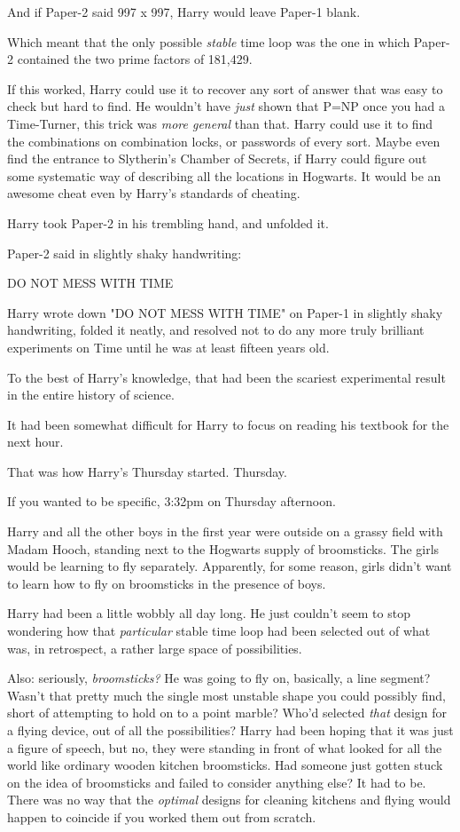 And if Paper-2 said 997 x 997, Harry would leave Paper-1 blank.

Which meant that the only possible \emph{stable} time loop was the one in which 
Paper-2 contained the two prime factors of 181,429.

If this worked, Harry could use it to recover any sort of answer that was easy 
to check but hard to find. He wouldn't have \emph{just} shown that P=NP once 
you had a Time-Turner, this trick was \emph{more general} than that. Harry 
could use it to find the combinations on combination locks, or passwords of 
every sort. Maybe even find the entrance to Slytherin's Chamber of Secrets, if 
Harry could figure out some systematic way of describing all the locations in 
Hogwarts. It would be an awesome cheat even by Harry's standards of cheating.

Harry took Paper-2 in his trembling hand, and unfolded it.

Paper-2 said in slightly shaky handwriting:

DO NOT MESS WITH TIME

Harry wrote down "DO NOT MESS WITH TIME" on Paper-1 in slightly shaky 
handwriting, folded it neatly, and resolved not to do any more truly brilliant 
experiments on Time until he was at least fifteen years old.

To the best of Harry's knowledge, that had been the scariest experimental 
result in the entire history of science.

It had been somewhat difficult for Harry to focus on reading his textbook for 
the next hour.

That was how Harry's Thursday started.
\sbreak
Thursday.

If you wanted to be specific, 3:32pm on Thursday afternoon.

Harry and all the other boys in the first year were outside on a grassy field 
with Madam Hooch, standing next to the Hogwarts supply of broomsticks. The 
girls would be learning to fly separately. Apparently, for some reason, girls 
didn't want to learn how to fly on broomsticks in the presence of boys.

Harry had been a little wobbly all day long. He just couldn't seem to stop 
wondering how that \emph{particular} stable time loop had been selected out of 
what was, in retrospect, a rather large space of possibilities.

Also: seriously, \emph{broomsticks?} He was going to fly on, basically, a line 
segment? Wasn't that pretty much the single most unstable shape you could 
possibly find, short of attempting to hold on to a point marble? Who'd selected 
\emph{that} design for a flying device, out of all the possibilities? Harry had 
been hoping that it was just a figure of speech, but no, they were standing in 
front of what looked for all the world like ordinary wooden kitchen 
broomsticks. Had someone just gotten stuck on the idea of broomsticks and 
failed to consider anything else? It had to be. There was no way that the 
\emph{optimal} designs for cleaning kitchens and flying would happen to 
coincide if you worked them out from scratch.

